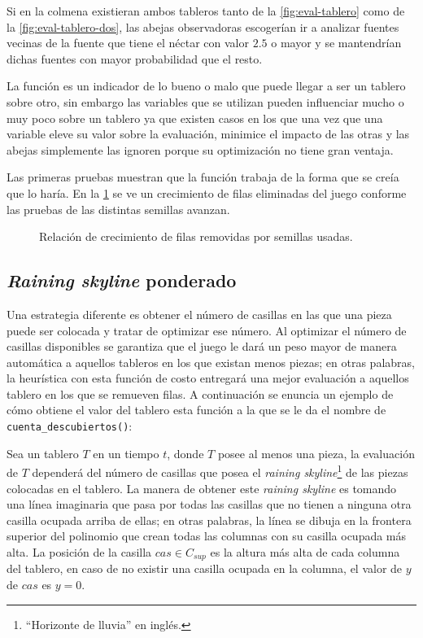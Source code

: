 Si en la colmena existieran ambos tableros tanto de la \cref{fig:eval-tablero} 
como de la \cref{fig:eval-tablero-dos}, las abejas observadoras escogerían ir a analizar 
fuentes vecinas de la fuente que tiene el néctar con valor $2.5$ o mayor y se 
mantendrían dichas fuentes con mayor probabilidad que el resto.

La función es un indicador de lo bueno o malo que puede llegar a ser un tablero 
sobre otro, sin embargo las variables que se utilizan pueden influenciar mucho 
o muy poco sobre un tablero ya que existen casos en los que una vez que una variable 
eleve su valor sobre la evaluación, minimice el impacto de las otras y las abejas 
simplemente las ignoren porque su optimización no tiene gran ventaja.

Las primeras pruebas muestran que la función trabaja de la forma que se creía que 
lo haría. En la \cref{fig:filaspesosresulprim} se ve un crecimiento de filas 
eliminadas del juego conforme las pruebas de las distintas semillas avanzan.

\begin{figure}[H]

\caption[short caption]{Relación de crecimiento de filas removidas por semillas usadas.}
\label{fig:filaspesosresulprim}
\end{figure} 


\subsection{\textit{Raining skyline} ponderado}

Una estrategia diferente es obtener el número de casillas en las que una 
pieza puede ser colocada y tratar de optimizar ese número. Al optimizar 
el número de casillas disponibles se garantiza que el juego le dará un 
peso mayor de manera automática 
a aquellos tableros en los que existan menos piezas; en otras palabras, 
la heurística con esta función de costo entregará una mejor evaluación 
a aquellos tablero en los que se remueven filas. A continuación se enuncia 
un ejemplo de cómo obtiene el valor del tablero esta función a la que 
se le da el nombre de \texttt{cuenta\_descubiertos()}:




Sea un tablero $T$ en un tiempo $t$, donde $T$ posee al menos una pieza, 
la evaluación de $T$ dependerá del número de casillas que posea el \textit{raining 
skyline}\footnote{``Horizonte de lluvia'' en inglés.} de las piezas colocadas 
en el tablero. La manera de obtener este \emph{raining 
skyline} es tomando una línea imaginaria que pasa por todas las casillas que no tienen 
a ninguna otra casilla ocupada arriba de ellas; en otras palabras, la línea se 
dibuja en la frontera superior del polinomio que crean todas las columnas con su 
casilla ocupada más alta. 
La posición de la casilla $cas \in C_{sup}$ es la altura más alta 
de cada columna del tablero, en caso de no existir una casilla ocupada en la columna, 
el valor de $y$ de $cas$ es $y=0$.

